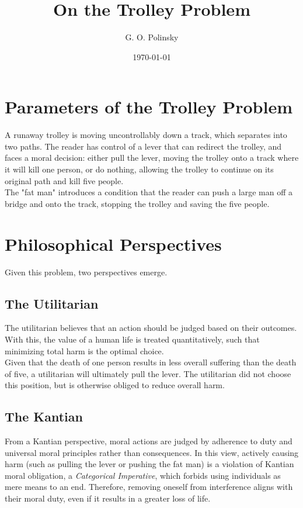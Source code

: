 \documentclass[12pt]{article}
\title{On the Trolley Problem}
\author{G. O. Polinsky}
\date{\today}
\begin{document}
    \maketitle

    \section{Parameters of the Trolley Problem}
    A runaway trolley is moving uncontrollably down a track, which separates 
    into two paths. The reader has control of a lever that can redirect 
    the trolley, and faces a moral decision: either pull the lever, 
    moving the trolley onto a track where it will kill one person, or 
    do nothing, allowing the trolley to continue on its original path and 
    kill five people. \\

    The "fat man" introduces a condition that the reader can 
    push a large man off a bridge and onto the track, stopping 
    the trolley and saving the five people. \\
    
    \section{Philosophical Perspectives}
        
        Given this problem, two perspectives emerge.

        \subsection{The Utilitarian}
        The utilitarian believes that an action should be judged based on 
        their outcomes. With this, the value of a human life is 
        treated quantitatively, such that minimizing total harm 
        is the optimal choice. \\ 
        
        Given that the death of one person results in less overall 
        suffering than the death of five, a utilitarian will ultimately 
        pull the lever. The utilitarian did not choose this position, 
        but is otherwise obliged to reduce overall harm. \\

        \subsection{The Kantian}
        From a Kantian perspective, moral actions are judged by adherence to duty 
        and universal moral principles rather than consequences. In this view, 
        actively causing harm (such as pulling the lever or pushing the fat man) 
        is a violation of Kantian moral obligation, a \textit{Categorical
        Imperative}, which forbids using individuals as mere means to an end. 
        Therefore, removing oneself from interference aligns with their 
        moral duty, even if it results in a greater loss of life. \\
\end{document}
